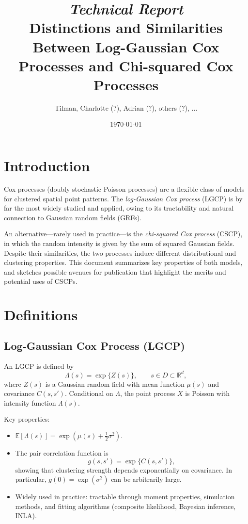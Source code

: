 \documentclass[11pt]{article}
\title{\textit{\textbf{Technical Report}}\\Distinctions and Similarities Between Log-Gaussian Cox Processes and Chi-squared Cox Processes}
\author{Tilman, Charlotte (?), Adrian (?), others (?), ...}
\date{\today}
\begin{document}
	\maketitle
	
	\section{Introduction}
	Cox processes (doubly stochastic Poisson processes) are a flexible class of models for clustered spatial point patterns. The \emph{log-Gaussian Cox process} (LGCP) is by far the most widely studied and applied, owing to its tractability and natural connection to Gaussian random fields (GRFs). 
	
	An alternative---rarely used in practice---is the \emph{chi-squared Cox process} (CSCP), in which the random intensity is given by the sum of squared Gaussian fields. Despite their similarities, the two processes induce different distributional and clustering properties. This document summarizes key properties of both models, and sketches possible avenues for publication that highlight the merits and potential uses of CSCPs.
	
	\section{Definitions}
	
	\subsection{Log-Gaussian Cox Process (LGCP)}
	An LGCP is defined by
	\[
	\Lambda(s) = \exp\{ Z(s) \}, \qquad s \in D \subset \mathbb{R}^d,
	\]
	where $Z(s)$ is a Gaussian random field with mean function $\mu(s)$ and covariance $C(s,s')$. Conditional on $\Lambda$, the point process $X$ is Poisson with intensity function $\Lambda(s)$.
	
	Key properties:
	\begin{itemize}
		\item $\mathbb{E}[\Lambda(s)] = \exp(\mu(s) + \tfrac{1}{2}\sigma^2)$.
		\item The pair correlation function is
		\[
		g(s,s') = \exp\{ C(s,s') \},
		\]
		showing that clustering strength depends exponentially on covariance. In particular, $g(0)=\exp(\sigma^2)$ can be arbitrarily large.
		\item Widely used in practice: tractable through moment properties, simulation methods, and fitting algorithms (composite likelihood, Bayesian inference, INLA).
	\end{itemize}
	
\end{document}
